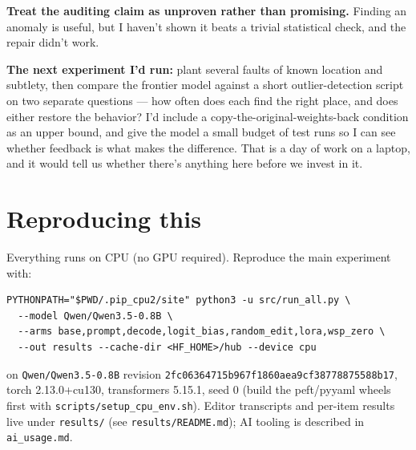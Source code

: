 \documentclass[11pt]{article}
\begin{document}
\textbf{Treat the auditing claim as unproven rather than promising.} Finding an anomaly is
useful, but I haven't shown it beats a trivial statistical check, and the repair didn't work.

\textbf{The next experiment I'd run:} plant several faults of known location and subtlety,
then compare the frontier model against a short outlier-detection script on two separate
questions --- how often does each find the right place, and does either restore the
behavior? I'd include a copy-the-original-weights-back condition as an upper bound, and give
the model a small budget of test runs so I can see whether feedback is what makes the
difference. That is a day of work on a laptop, and it would tell us whether there's anything
here before we invest in it.

\section{Reproducing this}

Everything runs on CPU (no GPU required). Reproduce the main experiment with:

\begin{verbatim}
PYTHONPATH="$PWD/.pip_cpu2/site" python3 -u src/run_all.py \
  --model Qwen/Qwen3.5-0.8B \
  --arms base,prompt,decode,logit_bias,random_edit,lora,wsp_zero \
  --out results --cache-dir <HF_HOME>/hub --device cpu
\end{verbatim}

on \texttt{Qwen/Qwen3.5-0.8B} revision \texttt{2fc06364715b967f1860aea9cf38778875588b17},
torch 2.13.0+cu130, transformers 5.15.1, seed 0 (build the peft/pyyaml wheels first with
\texttt{scripts/setup\_cpu\_env.sh}). Editor transcripts and per-item results live under
\texttt{results/} (see \texttt{results/README.md}); AI tooling is described in
\texttt{ai\_usage.md}.
\end{document}
